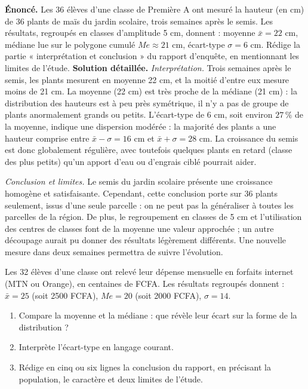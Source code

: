 \documentclass[11pt]{article}
\begin{document}
\begin{exoresolu}
\textbf{Énoncé.} Les 36 élèves d'une classe de Première A ont mesuré la hauteur (en cm) de 36 plants de maïs du jardin scolaire, trois semaines après le semis. Les résultats, regroupés en classes d'amplitude 5 cm, donnent : moyenne $\bar{x} = 22$ cm, médiane lue sur le polygone cumulé $Me \approx 21$ cm, écart-type $\sigma = 6$ cm. Rédige la partie « interprétation et conclusion » du rapport d'enquête, en mentionnant les limites de l'étude.
\tcblower
\textbf{Solution détaillée.}
\emph{Interprétation.} Trois semaines après le semis, les plants mesurent en moyenne 22 cm, et la moitié d'entre eux mesure moins de 21 cm. La moyenne (22 cm) est très proche de la médiane (21 cm) : la distribution des hauteurs est à peu près symétrique, il n'y a pas de groupe de plants anormalement grands ou petits. L'écart-type de 6 cm, soit environ $27\,\%$ de la moyenne, indique une dispersion modérée : la majorité des plants a une hauteur comprise entre $\bar{x}-\sigma = 16$ cm et $\bar{x}+\sigma = 28$ cm. La croissance du semis est donc globalement régulière, avec toutefois quelques plants en retard (classe des plus petits) qu'un apport d'eau ou d'engrais ciblé pourrait aider.

\emph{Conclusion et limites.} Le semis du jardin scolaire présente une croissance homogène et satisfaisante. Cependant, cette conclusion porte sur 36 plants seulement, issus d'une seule parcelle : on ne peut pas la généraliser à toutes les parcelles de la région. De plus, le regroupement en classes de 5 cm et l'utilisation des centres de classes font de la moyenne une valeur approchée ; un autre découpage aurait pu donner des résultats légèrement différents. Une nouvelle mesure dans deux semaines permettra de suivre l'évolution.
\end{exoresolu}

\begin{exercice}
Les 32 élèves d'une classe ont relevé leur dépense mensuelle en forfaits internet (MTN ou Orange), en centaines de FCFA. Les résultats regroupés donnent : $\bar{x} = 25$ (soit \num{2500} FCFA), $Me = 20$ (soit \num{2000} FCFA), $\sigma = 14$.
\begin{enumerate}
\item Compare la moyenne et la médiane : que révèle leur écart sur la forme de la distribution ?
\item Interprète l'écart-type en langage courant.
\item Rédige en cinq ou six lignes la conclusion du rapport, en précisant la population, le caractère et deux limites de l'étude.
\end{enumerate}
\end{exercice}
\end{document}
